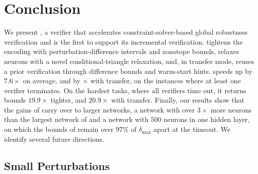 ﻿%
%
%
\chapter{Conclusion}
\label{ch:discussion}



We present \tool, a verifier that accelerates constraint-solver-based
global robustness verification and is the first to support its
incremental verification. \tool tightens the encoding with
perturbation-difference intervals and zonotope bounds, relaxes neurons
with a novel conditional-triangle relaxation, and, in transfer mode,
reuses a prior verification through difference bounds and warm-start
hints. \tool speeds up \baseline by $7.6\times$ on
average, and by $\times$ with transfer, on the instances
where at least one verifier terminates. On the
hardest tasks, where all verifiers time out, it returns bounds
$19.9\times$ tighter, and $20.9\times$
with transfer. Finally, our results show that the gains of \tool carry
over to larger networks, a network with
over $3\times$ more neurons than the largest network of \baseline and a
network with 500 neurons in one hidden layer, on which the bounds of
\baseline remain over $97\%$ of $\delta_{\max}$ apart at the timeout. We identify several future directions.

\section{Small Perturbations}
\label{sec:future-small-perturbations}

